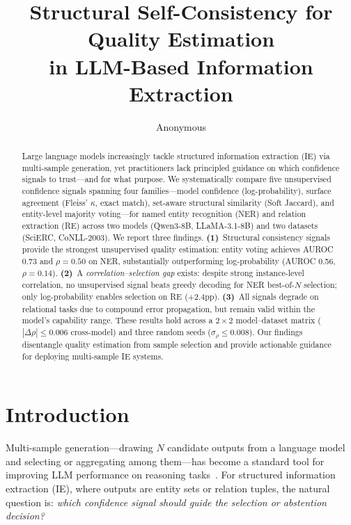\documentclass[11pt]{article}
\title{Structural Self-Consistency for Quality Estimation\\in LLM-Based Information Extraction}
\author{Anonymous}
\date{}
\begin{document}
\maketitle

\begin{abstract}
Large language models increasingly tackle structured information extraction (IE) via multi-sample generation, yet practitioners lack principled guidance on which confidence signals to trust---and for what purpose.
We systematically compare five unsupervised confidence signals spanning four families---model confidence (log-probability), surface agreement (Fleiss' $\kappa$, exact match), set-aware structural similarity (Soft Jaccard), and entity-level majority voting---for named entity recognition (NER) and relation extraction (RE) across two models (Qwen3-8B, LLaMA-3.1-8B) and two datasets (SciERC, CoNLL-2003).
We report three findings.
\textbf{(1)}~Structural consistency signals provide the strongest unsupervised quality estimation: entity voting achieves AUROC 0.73 and $\rho{=}0.50$ on NER, substantially outperforming log-probability (AUROC 0.56, $\rho{=}0.14$).
\textbf{(2)}~A \emph{correlation--selection gap} exists: despite strong instance-level correlation, no unsupervised signal beats greedy decoding for NER best-of-$N$ selection; only log-probability enables selection on RE (+2.4pp).
\textbf{(3)}~All signals degrade on relational tasks due to compound error propagation, but remain valid within the model's capability range.
These results hold across a $2{\times}2$ model--dataset matrix ($|\Delta\rho|{\le}0.006$ cross-model) and three random seeds ($\sigma_\rho{\le}0.008$).
Our findings disentangle quality estimation from sample selection and provide actionable guidance for deploying multi-sample IE systems.
\end{abstract}

\section{Introduction}

Multi-sample generation---drawing $N$ candidate outputs from a language model and selecting or aggregating among them---has become a standard tool for improving LLM performance on reasoning tasks~\cite{wang2023selfconsistency,snell2024scaling,brown2024tts}.
For structured information extraction (IE), where outputs are entity sets or relation tuples, the natural question is: \emph{which confidence signal should guide the selection or abstention decision?}
\end{document}
